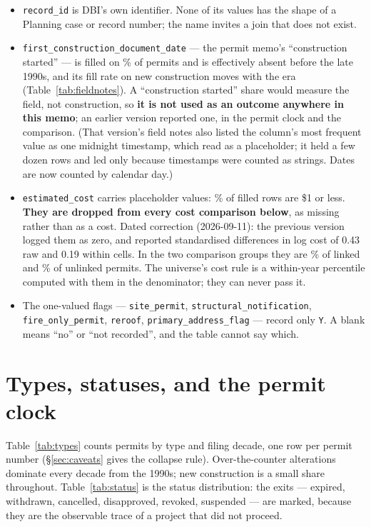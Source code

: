 \documentclass[11pt]{article}
\begin{document}
\begin{itemize}
\item \texttt{record\_id} is DBI's own identifier. None of its values has the shape of a
Planning case or record number; the name invites a join that does not exist.
\item \texttt{first\_construction\_document\_date} --- the permit memo's ``construction
started'' --- is filled on \pcFcdFilled\% of permits and is effectively absent before the late
1990s, and its fill rate on new construction moves with the era (Table~\ref{tab:fieldnotes}).
A ``construction started'' share would measure the field, not construction, so \textbf{it is
not used as an outcome anywhere in this memo}; an earlier version reported one, in the permit
clock and the comparison. (That version's field notes also listed the column's most frequent
value as one midnight timestamp, which read as a placeholder; it held a few dozen rows and led
only because timestamps were counted as strings. Dates are now counted by calendar day.)
\item \texttt{estimated\_cost} carries placeholder values: \pcCostPlaceholder\% of filled rows
are \$1 or less. \textbf{They are dropped from every cost comparison below}, as missing rather
than as a cost. Dated correction (2026-09-11): the previous version logged them as
zero, and reported standardised differences in log cost of 0.43 raw and 0.19 within cells. In
the two comparison groups they are \pcCostPlaceholderLinked\% of linked and
\pcCostPlaceholderUnlinked\% of unlinked permits. The universe's cost rule is a within-year
percentile computed with them in the denominator; they can never pass it.
\item The one-valued flags --- \texttt{site\_permit}, \texttt{structural\_notification},
\texttt{fire\_only\_permit}, \texttt{reroof}, \texttt{primary\_address\_flag} --- record only
\texttt{Y}. A blank means ``no'' or ``not recorded'', and the table cannot say which.
\end{itemize}



\section{Types, statuses, and the permit clock}

Table~\ref{tab:types} counts permits by type and filing decade, one row per permit number
(\S\ref{sec:caveats} gives the collapse rule). Over-the-counter alterations dominate every
decade from the 1990s; new construction is a small share throughout. Table~\ref{tab:status} is
the status distribution: the exits --- expired, withdrawn, cancelled, disapproved, revoked,
suspended --- are marked, because they are the observable trace of a project that did not
proceed.
\end{document}
